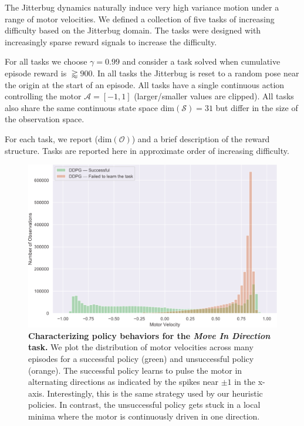 \documentclass{article}
\begin{document}
The Jitterbug dynamics naturally induce very high variance motion under a range of motor velocities.
We defined a collection of five tasks of increasing difficulty based on the Jitterbug domain.
The tasks were designed with increasingly sparse reward signals to increase the difficulty.

For all tasks we choose $\gamma = 0.99$ and consider a task solved when cumulative episode reward is $\gtrapprox 900$.
In all tasks the Jitterbug is reset to a random pose near the origin at the start of an episode.
All tasks have a single continuous action controlling the motor $\mathcal{A} = [-1, 1]$ (larger/smaller values are clipped).
All tasks also share the same continuous state space $\text{dim}(\mathcal{S}) = 31$ but differ in the size of the observation space.

For each task, we report ($\text{dim}(\mathcal{O})$) and a brief description of the reward structure.
Tasks are reported here in approximate order of increasing difficulty.

\begin{figure}[t]
    \centering
    \includegraphics[width=\linewidth]{fig-motor-hist}
    \caption{
        \textbf{Characterizing policy behaviors for the \emph{Move In Direction} task.}
        We plot the distribution of motor velocities across many episodes for a successful policy (green) and unsuccessful policy (orange).
        The successful policy learns to pulse the motor in alternating directions as indicated by the spikes near $\pm 1$ in the x-axis.
        Interestingly, this is the same strategy used by our heuristic policies.
        In contrast, the unsuccessful policy gets stuck in a local minima where the motor is continuously driven in one direction.
    }
    \label{fig:motor-hist}
\end{figure}
\end{document}
